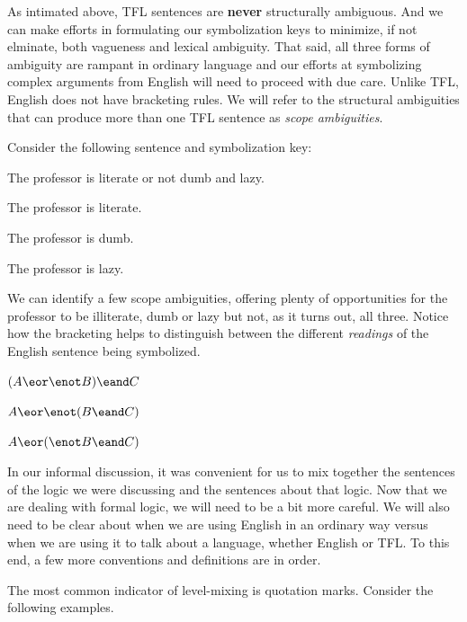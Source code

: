 As intimated above, TFL sentences are \textbf{never} structurally ambiguous.
And we can make efforts in formulating our symbolization keys to minimize, if
not elminate, both vagueness and lexical ambiguity. That said, all three forms
of ambiguity are rampant in ordinary language and our efforts at symbolizing
complex arguments from English will need to proceed with due care. Unlike TFL,
English does not have bracketing rules. We will refer to the structural
ambiguities that can produce more than one TFL sentence as \emph{scope
ambiguities}.

Consider the following sentence and symbolization key:

\begin{argument}
\item[\textbf{(P)}] The professor is literate or not dumb and lazy.
\end{argument}

\begin{argument}
\item[A:] The professor is literate.
\item[B:] The professor is dumb.
\item[C:] The professor is lazy.
\end{argument}

We can identify a few scope ambiguities, offering plenty of opportunities for
the professor to be illiterate, dumb or lazy but not, as it turns out, all
three. Notice how the bracketing helps to distinguish between the different
\emph{readings} of the English sentence being symbolized.

\begin{argument}
  \item[] $(A \eor \enot B) \eand C$
  \item[] $A \eor \enot (B \eand C)$
  \item[] $A \eor (\enot B \eand C)$
\end{argument}

In our informal discussion, it was convenient for us to mix together the
sentences of the logic we were discussing and the sentences about that logic.
Now that we are dealing with formal logic, we will need to be a bit more
careful. We will also need to be clear about when we are using English in an
ordinary way versus when we are using it to talk about a language, whether
English or TFL. To this end, a few more conventions and definitions are in
order.

The most common indicator of level-mixing is quotation marks. Consider the
following examples.

